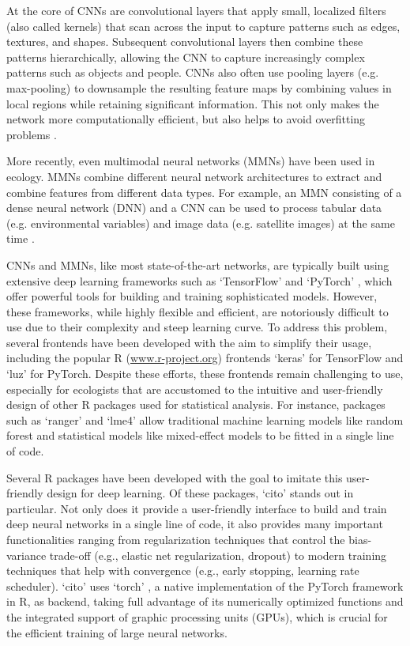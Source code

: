 \documentclass[12pt,twoside]{scrreport}
\newcommand{\pkg}[1]{`#1'}
\begin{document}
At the core of CNNs are convolutional layers that apply small, localized filters (also called kernels) that scan across the input to capture patterns such as edges, textures, and shapes. Subsequent convolutional layers then combine these patterns hierarchically, allowing the CNN to capture increasingly complex patterns such as objects and people. CNNs also often use pooling layers (e.g. max-pooling) to downsample the resulting feature maps by combining values in local regions while retaining significant information. This not only makes the network more computationally efficient, but also helps to avoid overfitting problems \citep{liSurveyConvolutionalNeural2022}.

More recently, even multimodal neural networks (MMNs) have been used in ecology. MMNs combine different neural network architectures to extract and combine features from different data types. For example, an MMN consisting of a dense neural network (DNN) and a CNN can be used to process tabular data (e.g. environmental variables) and image data (e.g. satellite images) at the same time \citep{zhangNovelMultimodalSpecies2022, hu2024introduction}.

CNNs and MMNs, like most state-of-the-art networks, are typically built using extensive deep learning frameworks such as \pkg{TensorFlow} \citep{abadiTensorFlowSystemLargeScale2016} and \pkg{PyTorch} \citep{paszkePyTorchImperativeStyle2019}, which offer powerful tools for building and training sophisticated models. However, these frameworks, while highly flexible and efficient, are notoriously difficult to use due to their complexity and steep learning curve. To address this problem, several frontends have been developed with the aim to simplify their usage, including the popular R (\url{www.r-project.org}) frontends \pkg{keras} \citep{chollet2015keras} for TensorFlow and \pkg{luz} \citep{falbelLuzHigherLevel2024} for PyTorch. Despite these efforts, these frontends remain challenging to use, especially for ecologists that are accustomed to the intuitive and user-friendly design of other R packages used for statistical analysis. For instance, packages such as \pkg{ranger} and \pkg{lme4} allow traditional machine learning models like random forest and statistical models like mixed-effect models to be fitted in a single line of code.

Several R packages have been developed with the goal to imitate this user-friendly design for deep learning. Of these packages, \pkg{cito} \citep{amesoderCitoPackageTraining2024} stands out in particular. Not only does it provide a user-friendly interface to build and train deep neural networks in a single line of code, it also provides many important functionalities ranging from regularization techniques that control the bias-variance trade-off (e.g., elastic net regularization, dropout) to modern training techniques that help with convergence (e.g., early stopping, learning rate scheduler). \pkg{cito} uses \pkg{torch} \citep{falbelTorchTensorsNeural2024}, a native implementation of the PyTorch framework in R, as backend, taking full advantage of its numerically optimized functions and the integrated support of graphic processing units (GPUs), which is crucial for the efficient training of large neural networks.
\end{document}
